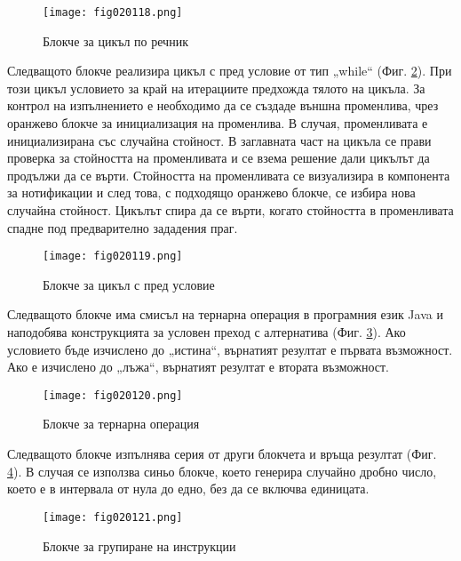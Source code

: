 \begin{figure}[H]
  \centering
  \texttt{[image: fig020118.png]}
  \caption{Блокче за цикъл по речник}
\label{fig020118}
\end{figure}

Следващото блокче реализира цикъл с пред условие от тип „while“ (Фиг. \ref{fig020119}). При този цикъл условието за край на итерациите предхожда тялото на цикъла. За контрол на изпълнението е необходимо да се създаде външна променлива, чрез оранжево блокче за инициализация на променлива. В случая, променливата е инициализирана със случайна стойност. В заглавната част на цикъла се прави проверка за стойността на променливата и се взема решение дали цикълът да продължи да се върти. Стойността на променливата се визуализира в компонента за нотификации и след това, с подходящо оранжево блокче, се избира нова случайна стойност. Цикълът спира да се върти, когато стойността в променливата спадне под предварително зададения праг. 

\begin{figure}[H]
  \centering
  \texttt{[image: fig020119.png]}
  \caption{Блокче за цикъл с пред условие}
\label{fig020119}
\end{figure}

Следващото блокче има смисъл на тернарна операция в програмния език Java и наподобява конструкцията за условен преход с алтернатива (Фиг. \ref{fig020120}). Ако условието бъде изчислено до „истина“, върнатият резултат е първата възможност. Ако е изчислено до „лъжа“, върнатият резултат е втората възможност. 

\begin{figure}[H]
  \centering
  \texttt{[image: fig020120.png]}
  \caption{Блокче за тернарна операция}
\label{fig020120}
\end{figure}

Следващото блокче изпълнява серия от други блокчета и връща резултат (Фиг. \ref{fig020121}). В случая се използва синьо блокче, което генерира случайно дробно число, което е в интервала от нула до едно, без да се включва единицата. 

\begin{figure}[H]
  \centering
  \texttt{[image: fig020121.png]}
  \caption{Блокче за групиране на инструкции}
\label{fig020121}
\end{figure}

